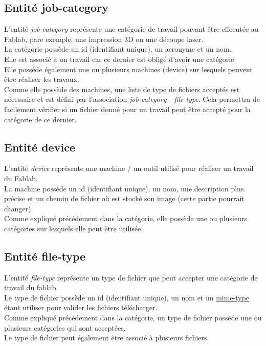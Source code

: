 \documentclass[
    iai, %
    il, %
]{heig-tb}
\begin{document}
\subsection{Entité job-category}
L'entité \emph{job-category} représente une catégorie de travail pouvant être effecutée au Fablab, pare exemple, une impression 3D ou une découpe laser.\\
La catégorie possède un id (identifiant unique), un acronyme et un nom.\\
Elle est associé à un travail car ce dernier est obligé d'avoir une catégorie.\\
Elle possède également une ou plusieurs machines (device) sur lesquels peuvent être réaliser les travaux.\\
Comme elle possède des machines, une liste de type de fichiers acceptés est nécessaire et est défini par l'association \emph{job-category - file-type}. Cela permettra de facilement vérifier si un fichier donné pour un travail peut être accepté pour la catégorie de ce dernier.

\subsection{Entité device}
L'entité \emph{device} représente une machine / un outil utilisé pour réaliser un travail du Fablab.\\
La machine possède un id (identifiant unique), un nom, une description plus précise et un chemin de fichier où est stocké son image (cette partie pourrait changer).\\
Comme expliqué précédement dans la catégorie, elle possède une ou plusieurs catégories sur lesquels elle peut être utilisée.\\

\subsection{Entité file-type}
L'entité \emph{file-type} représente un type de fichier que peut accepter une catégorie de travail du fablab.\\
Le type de fichier possède un id (identifiant unique), un nom et un \href{https://developer.mozilla.org/fr/docs/Web/HTTP/Basics_of_HTTP/MIME_Types}{mime-type} étant utiliser pour valider les fichiers télécharger.\\
Comme expliqué précédement dans la catégorie, un type de fichier possède une ou plusieurs catégories qui sont acceptées.\\
Le type de fichier peut également être associé à plusieurs fichiers.
\end{document}
